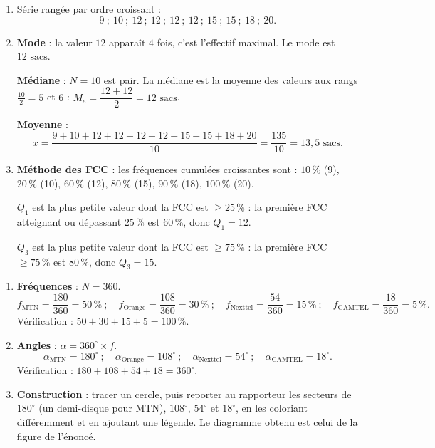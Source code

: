 \documentclass[11pt]{article}
\begin{document}
\begin{corrige}
\begin{enumerate}
    \item Série rangée par ordre croissant :
    \[ 9\ ;\ 10\ ;\ 12\ ;\ 12\ ;\ 12\ ;\ 12\ ;\ 15\ ;\ 15\ ;\ 18\ ;\ 20. \]
    \item \textbf{Mode} : la valeur $12$ apparaît $4$ fois, c'est l'effectif maximal. Le mode est $\boxed{12\text{ sacs}}$.
    
    \textbf{Médiane} : $N=10$ est pair. La médiane est la moyenne des valeurs aux rangs $\frac{10}{2}=5$ et $6$ : $M_e=\dfrac{12+12}{2}=\boxed{12\text{ sacs}}$.
    
    \textbf{Moyenne} :
    \[ \bar{x}=\frac{9+10+12+12+12+12+15+15+18+20}{10}=\frac{135}{10}=\boxed{13{,}5\text{ sacs}}. \]
    \item \textbf{Méthode des FCC} : les fréquences cumulées croissantes sont : $10\,\%$ (9), $20\,\%$ (10), $60\,\%$ (12), $80\,\%$ (15), $90\,\%$ (18), $100\,\%$ (20).
    
    $Q_1$ est la plus petite valeur dont la FCC est $\ge 25\,\%$ : la première FCC atteignant ou dépassant $25\,\%$ est $60\,\%$, donc $\boxed{Q_1=12}$.
    
    $Q_3$ est la plus petite valeur dont la FCC est $\ge 75\,\%$ : la première FCC $\ge 75\,\%$ est $80\,\%$, donc $\boxed{Q_3=15}$.
\end{enumerate}
\end{corrige}

\begin{corrige}
\begin{enumerate}
    \item \textbf{Fréquences} : $N=360$.
    \[ f_{\text{MTN}}=\frac{180}{360}=50\,\%\ ;\quad f_{\text{Orange}}=\frac{108}{360}=30\,\%\ ;\quad f_{\text{Nexttel}}=\frac{54}{360}=15\,\%\ ;\quad f_{\text{CAMTEL}}=\frac{18}{360}=5\,\%. \]
    Vérification : $50+30+15+5=100\,\%$.
    \item \textbf{Angles} : $\alpha = 360^{\circ}\times f$.
    \[ \alpha_{\text{MTN}}=180^{\circ}\ ;\quad \alpha_{\text{Orange}}=108^{\circ}\ ;\quad \alpha_{\text{Nexttel}}=54^{\circ}\ ;\quad \alpha_{\text{CAMTEL}}=18^{\circ}. \]
    Vérification : $180+108+54+18=360^{\circ}$.
    \item \textbf{Construction} : tracer un cercle, puis reporter au rapporteur les secteurs de $180^{\circ}$ (un demi-disque pour MTN), $108^{\circ}$, $54^{\circ}$ et $18^{\circ}$, en les coloriant différemment et en ajoutant une légende. Le diagramme obtenu est celui de la figure de l'énoncé.
\end{enumerate}
\end{corrige}
\end{document}
